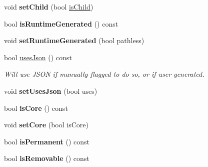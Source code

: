 \begin{Indent}
\begin{DoxyCompactItemize}
\mbox{\label{classrev_1_1_resource_handle_a6b31339ebad9320ace1fd4fc77b64328}} 
void {\bfseries set\+Child} (bool \mbox{\hyperlink{classrev_1_1_resource_handle_a842afcae330ba31cb2ca909fa09deaba}{is\+Child}})
\item 
\mbox{\label{classrev_1_1_resource_handle_ac6bb2a3cc1b897b3978aa18dce6f5efd}} 
bool {\bfseries is\+Runtime\+Generated} () const
\item 
\mbox{\label{classrev_1_1_resource_handle_ae6fb1f8c8254238c8b175d450ffb23e1}} 
void {\bfseries set\+Runtime\+Generated} (bool pathless)
\item 
\mbox{\label{classrev_1_1_resource_handle_a0029eb6c682e41e44a1829bc8181faf0}} 
bool \mbox{\hyperlink{classrev_1_1_resource_handle_a0029eb6c682e41e44a1829bc8181faf0}{uses\+Json}} () const
\begin{DoxyCompactList}\small\item\em Will use J\+S\+ON if manually flagged to do so, or if user generated. \end{DoxyCompactList}\item 
\mbox{\label{classrev_1_1_resource_handle_aa4faa3db5c82fe6c19be4c0617956498}} 
void {\bfseries set\+Uses\+Json} (bool uses)
\item 
\mbox{\label{classrev_1_1_resource_handle_ac155caea855156285945346cb2516059}} 
bool {\bfseries is\+Core} () const
\item 
\mbox{\label{classrev_1_1_resource_handle_a2837817d2b0fe99ff318e0419a4a89cc}} 
void {\bfseries set\+Core} (bool is\+Core)
\item 
\mbox{\label{classrev_1_1_resource_handle_aefdec233e9ed0d808802dc30dc5146dd}} 
bool {\bfseries is\+Permanent} () const
\item 
\mbox{\label{classrev_1_1_resource_handle_a06275514b1a583c48dea15cbac8282e2}} 
bool {\bfseries is\+Removable} () const
\item 

\end{DoxyCompactItemize}
\end{Indent}
